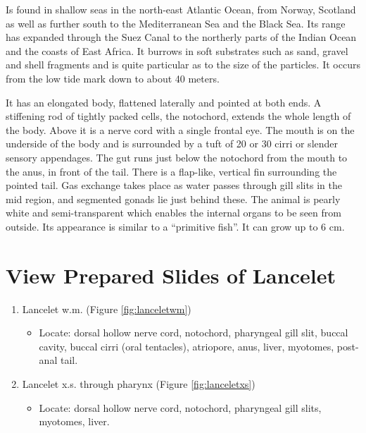 Is found in shallow seas in the north-east Atlantic Ocean, from Norway,
Scotland as well as further south to the Mediterranean Sea and the Black
Sea. Its range has expanded through the Suez Canal to the northerly
parts of the Indian Ocean and the coasts of East Africa. It burrows in
soft substrates such as sand, gravel and shell fragments and is quite
particular as to the size of the particles. It occurs from the low tide
mark down to about 40 meters.

It has an elongated body, flattened laterally and pointed at both ends.
A stiffening rod of tightly packed cells, the notochord, extends the
whole length of the body. Above it is a nerve cord with a single frontal
eye. The mouth is on the underside of the body and is surrounded by a
tuft of 20 or 30 cirri or slender sensory appendages. The gut runs just
below the notochord from the mouth to the anus, in front of the tail.
There is a flap-like, vertical fin surrounding the pointed tail. Gas
exchange takes place as water passes through gill slits in the mid
region, and segmented gonads lie just behind these. The animal is pearly
white and semi-transparent which enables the internal organs to be seen
from outside. Its appearance is similar to a ``primitive fish''. It can
grow up to 6 cm.

\section{View Prepared Slides of
Lancelet}\label{view-prepared-slides-of-lancelet}

\begin{enumerate}
\def\labelenumi{\arabic{enumi}.}
\tightlist
\item
  Lancelet w.m. (Figure \ref{fig:lanceletwm})

  \begin{itemize}
  \tightlist
  \item
    Locate: dorsal hollow nerve cord, notochord, pharyngeal gill slit,
    buccal cavity, buccal cirri (oral tentacles), atriopore, anus,
    liver, myotomes, post-anal tail.
  \end{itemize}
\item
  Lancelet x.s. through pharynx (Figure \ref{fig:lanceletxs})

  \begin{itemize}
  \tightlist
  \item
    Locate: dorsal hollow nerve cord, notochord, pharyngeal gill slits,
    myotomes, liver.
  \end{itemize}
\end{enumerate}

